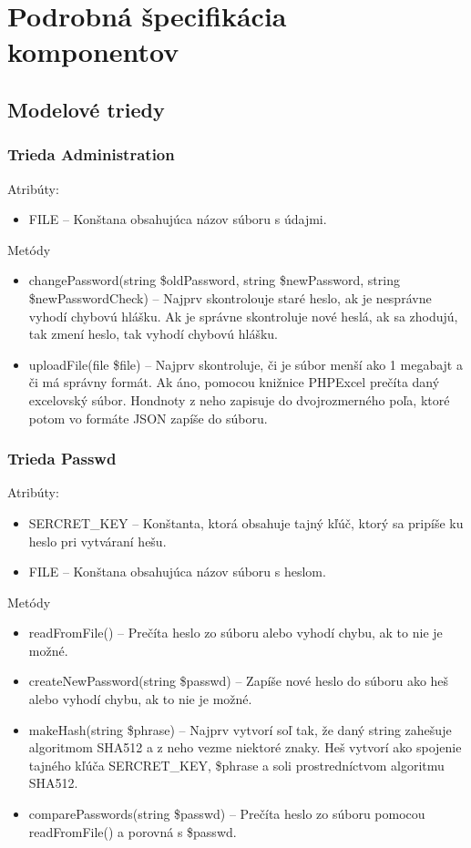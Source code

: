 \documentclass[12pt,a4paper]{report}
\begin{document}
\chapter[Podrobná špecifikácia komponentov]{\rmfamily\bfseries
	Podrobná špecifikácia komponentov}

\section[Modelové triedy]{\rmfamily\bfseries
	Modelové triedy}

\subsection[Trieda Administration]{\rmfamily\bfseries
	Trieda Administration}
Atribúty:
\begin{itemize}
	\item FILE – Konštana obsahujúca názov súboru s údajmi. 
\end{itemize}
Metódy
\begin{itemize}
	\item changePassword(string \$oldPassword, string \$newPassword, string \$newPasswordCheck) – Najprv skontrolouje staré heslo, ak je nesprávne vyhodí chybovú hlášku. Ak je správne skontroluje nové heslá, ak sa zhodujú, tak zmení heslo, tak vyhodí chybovú hlášku.
	\item uploadFile(file \$file) – Najprv skontroluje, či je súbor menší ako 1 megabajt a či má správny formát. Ak áno, pomocou knižnice PHPExcel prečíta daný excelovský súbor. Hondnoty z neho zapisuje do dvojrozmerného poľa, ktoré potom vo formáte JSON zapíše do súboru.
\end{itemize}

\subsection[Trieda Passwd]{\rmfamily\bfseries
	Trieda Passwd}
Atribúty:
\begin{itemize}
	\item SERCRET\_KEY – Konštanta, ktorá obsahuje tajný kľúč, ktorý sa pripíše ku heslo pri vytváraní hešu. 
	\item FILE – Konštana obsahujúca názov súboru s heslom.
\end{itemize}
Metódy
\begin{itemize}
	\item readFromFile() – Prečíta heslo zo súboru alebo vyhodí chybu, ak to nie je možné.
	\item createNewPassword(string \$passwd) – Zapíše nové heslo do súboru ako heš alebo vyhodí chybu, ak to nie je možné.
	\item makeHash(string \$phrase) – Najprv vytvorí soľ tak, že daný string zahešuje algoritmom SHA512 a z neho vezme niektoré znaky. Heš vytvorí ako spojenie tajného kľúča SERCRET\_KEY, \$phrase a soli prostredníctvom algoritmu SHA512.
	\item comparePasswords(string \$passwd) – Prečíta heslo zo súboru pomocou readFromFile() a porovná s \$passwd.
\end{itemize}
\end{document}
